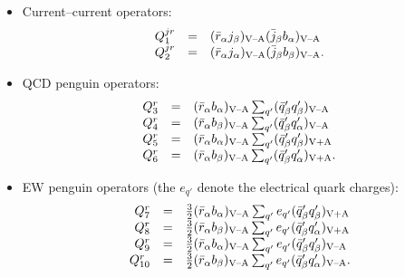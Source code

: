 \documentclass[12pt]{article}
\begin{document}
\begin{itemize}
\item Current--current operators:
\begin{equation}
\begin{array}{rcl}
Q_{1}^{jr}&=&(\bar r_{\alpha}j_{\beta})_{\mbox{{\scriptsize V--A}}}
(\bar j_{\beta}b_{\alpha})_{\mbox{{\scriptsize V--A}}}\\
Q_{2}^{jr}&=&(\bar r_\alpha j_\alpha)_{\mbox{{\scriptsize 
V--A}}}(\bar j_\beta b_\beta)_{\mbox{{\scriptsize V--A}}}.
\end{array}
\end{equation}
\item QCD penguin operators:
\begin{equation}\label{qcd-penguins}
\begin{array}{rcl}
Q_{3}^r&=&(\bar r_\alpha b_\alpha)_{\mbox{{\scriptsize V--A}}}\sum_{q'}
(\bar q'_\beta q'_\beta)_{\mbox{{\scriptsize V--A}}}\\
Q_{4}^r&=&(\bar r_{\alpha}b_{\beta})_{\mbox{{\scriptsize V--A}}}
\sum_{q'}(\bar q'_{\beta}q'_{\alpha})_{\mbox{{\scriptsize V--A}}}\\
Q_{5}^r&=&(\bar r_\alpha b_\alpha)_{\mbox{{\scriptsize V--A}}}\sum_{q'}
(\bar q'_\beta q'_\beta)_{\mbox{{\scriptsize V+A}}}\\
Q_{6}^r&=&(\bar r_{\alpha}b_{\beta})_{\mbox{{\scriptsize V--A}}}
\sum_{q'}(\bar q'_{\beta}q'_{\alpha})_{\mbox{{\scriptsize V+A}}}.
\end{array}
\end{equation}
\item EW penguin operators (the $e_{q'}$ denote the
electrical quark charges):
\begin{equation}
\begin{array}{rcl}
Q_{7}^r&=&\frac{3}{2}(\bar r_\alpha b_\alpha)_{\mbox{{\scriptsize V--A}}}
\sum_{q'}e_{q'}(\bar q'_\beta q'_\beta)_{\mbox{{\scriptsize V+A}}}\\
Q_{8}^r&=&
\frac{3}{2}(\bar r_{\alpha}b_{\beta})_{\mbox{{\scriptsize V--A}}}
\sum_{q'}e_{q'}(\bar q_{\beta}'q'_{\alpha})_{\mbox{{\scriptsize V+A}}}\\
Q_{9}^r&=&\frac{3}{2}(\bar r_\alpha b_\alpha)_{\mbox{{\scriptsize V--A}}}
\sum_{q'}e_{q'}(\bar q'_\beta q'_\beta)_{\mbox{{\scriptsize V--A}}}\\
Q_{10}^r&=&
\frac{3}{2}(\bar r_{\alpha}b_{\beta})_{\mbox{{\scriptsize V--A}}}
\sum_{q'}e_{q'}(\bar q'_{\beta}q'_{\alpha})_{\mbox{{\scriptsize V--A}}}.
\end{array}
\end{equation}
\end{itemize}
\end{document}
